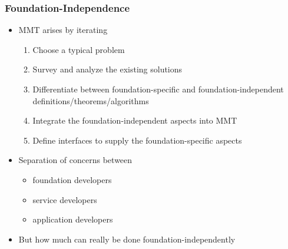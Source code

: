 \documentclass{beamer}
\renewcommand{\emph}[1]{\alert{#1}}
\begin{document}
\begin{frame}\frametitle{Foundation-Independence}
\begin{itemize}
 \item MMT arises by iterating
	\begin{enumerate}
	\item Choose a typical problem
	\item Survey and analyze the existing solutions
	\item Differentiate between \emph{foundation-specific} and \emph{foundation-independent} definitions/theorems/algorithms
	\item Integrate the foundation-independent aspects into MMT
	\item Define interfaces to supply the foundation-specific aspects
	\end{enumerate}
 \item Separation of concerns between
\begin{itemize}
  \item foundation developers
  \item service developers
  \item application developers
\end{itemize}
\item<2> But how much can really be done foundation-independently
\end{itemize}
\end{frame}

\end{document}
